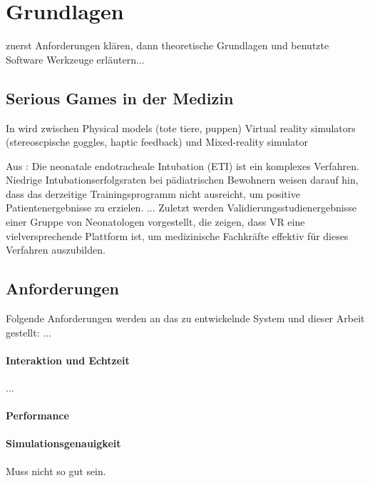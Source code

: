 \chapter{Grundlagen}
zuerst Anforderungen klären, dann theoretische Grundlagen und benutzte Software Werkzeuge erläutern...

\section{Serious Games in der Medizin}





In \cite{SimRole} wird zwischen Physical models (tote tiere, puppen) Virtual reality simulators (stereoscpische goggles, haptic feedback) und Mixed-reality simulator 



Aus \cite{VRSim20}:
Die neonatale endotracheale Intubation (ETI) ist ein komplexes Verfahren. Niedrige Intubationserfolgsraten bei pädiatrischen Bewohnern weisen darauf hin, dass das derzeitige Trainingsprogramm nicht ausreicht, um positive Patientenergebnisse zu erzielen. ...
Zuletzt werden Validierungsstudienergebnisse einer Gruppe von Neonatologen vorgestellt, die zeigen, dass VR eine vielversprechende Plattform ist, um medizinische Fachkräfte effektiv für dieses Verfahren auszubilden.



\section{Anforderungen}
\label{sec_Anforderungen}
Folgende Anforderungen werden an das zu entwickelnde System und dieser Arbeit gestellt: ...

\subsubsection{Interaktion und Echtzeit}
...

\subsubsection{Performance}

\subsubsection{Simulationsgenauigkeit}
Muss nicht so gut sein.

